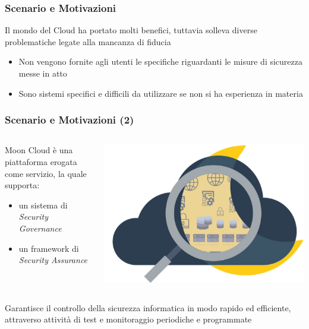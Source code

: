 \frame{\titlepage}

\begin{frame}
    \frametitle{Scenario e Motivazioni}
    Il mondo del Cloud ha portato molti benefici, tuttavia solleva diverse problematiche legate alla \alert{mancanza di fiducia}
    \hfill\break
    \begin{itemize}
        \item Non vengono fornite agli utenti le specifiche riguardanti le misure di sicurezza messe in atto
        \item Sono sistemi specifici e \alert{difficili da utilizzare} se non si ha esperienza in materia
    \end{itemize}
\end{frame}

\begin{frame}
    \frametitle{Scenario e Motivazioni (2)}
    \begin{columns}
        \begin{column}{0.55\textwidth}
            Moon Cloud è una piattaforma erogata come servizio, la quale supporta:
            \begin{itemize}
                \item un sistema di \textit{Security Governance}
                \item un framework di \alert{\textit{Security Assurance}}
            \end{itemize}
        \end{column}
        \begin{column}{0.4\textwidth}
            \begin{center}
                \includegraphics[scale=0.12]{images/mc}
            \end{center}
        \end{column}
    \end{columns}
    Garantisce il controllo della sicurezza informatica in modo rapido ed efficiente, attraverso attività di test e monitoraggio 
    periodiche e programmate
\end{frame}

